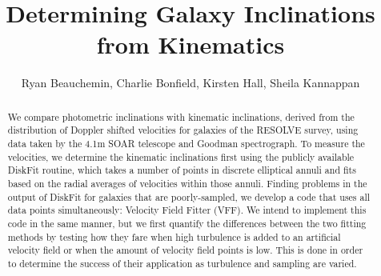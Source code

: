 \documentclass{emulateapj}
\begin{document}

\title{Determining Galaxy Inclinations from Kinematics}



\author{Ryan Beauchemin, Charlie Bonfield, Kirsten Hall, Sheila Kannappan}






\vspace{1cm}\begin{abstract}
\large We compare photometric inclinations with kinematic inclinations, derived from the distribution of Doppler shifted velocities for galaxies of the RESOLVE survey, using data taken by the 4.1m SOAR telescope and Goodman spectrograph. To measure the velocities, we determine the kinematic inclinations first using the publicly available DiskFit routine, which takes a number of points in discrete elliptical annuli and fits based on the radial averages of velocities within those annuli. Finding problems in the output of DiskFit for galaxies that are poorly-sampled, we develop a code that uses all data points simultaneously: Velocity Field Fitter (VFF). We intend to implement this code in the same manner, but we first quantify the differences between the two fitting methods by testing how they fare when high turbulence is added to an artificial velocity field or when the amount of velocity field points is low. This is done in order to determine the success of their application as turbulence and sampling are varied. 
\end{abstract}
\end{document}
